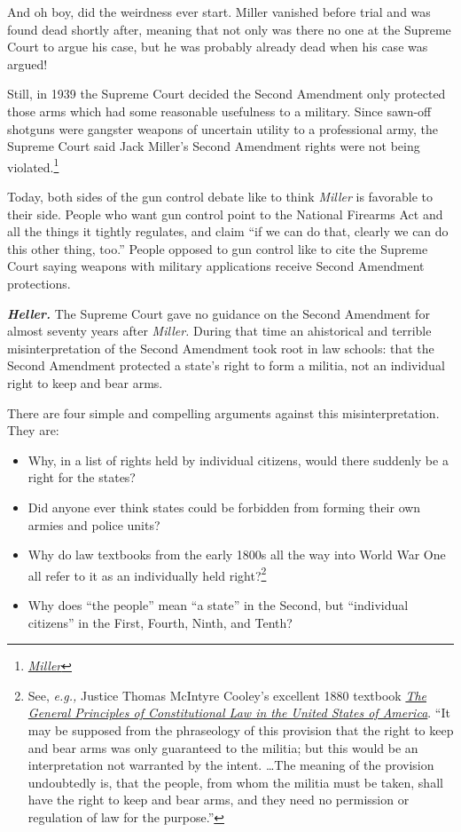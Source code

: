 \documentclass[10pt]{article}
\begin{document}
And oh boy, did the weirdness ever start.  Miller vanished before trial and was found dead shortly after, meaning that not only was there no one at the Supreme Court to argue his case, but he was probably already dead when his case was argued!

Still, in 1939 the Supreme Court decided the Second Amendment only protected those arms which had some reasonable usefulness to a military.  Since sawn-off shotguns were gangster weapons of uncertain utility to a professional army, the Supreme Court said Jack Miller's Second Amendment rights were not being violated.\footnote{\href{https://tile.loc.gov/storage-services/service/ll/usrep/usrep307/usrep307174/usrep307174.pdf}{\it Miller}}

Today, both sides of the gun control debate like to think \textit{Miller} is favorable to their side.  People who want gun control point to the National Firearms Act and all the things it tightly regulates, and claim ``if we can do that, clearly we can do this other thing, too.''  People opposed to gun control like to cite the Supreme Court saying weapons with military applications receive Second Amendment protections.

\vspace{0.5cm}

\textbf{\textit{Heller.}}  The Supreme Court gave no guidance on the Second Amendment for almost seventy years after \textit{Miller.}  During that time an ahistorical and terrible misinterpretation of the Second Amendment took root in law schools: that the Second Amendment protected a state's right to form a militia, not an individual right to keep and bear arms.

There are four simple and compelling arguments against this misinterpretation.  They are:

\begin{itemize}
\item Why, in a list of rights held by individual citizens, would there suddenly be a right for the states?
\item Did anyone ever think states could be forbidden from forming their own armies and police units?
\item Why do law textbooks from the early 1800s all the way into World War One all refer to it as an individually held right?\footnote{See, \textit{e.g.,} Justice Thomas McIntyre Cooley's excellent 1880 textbook \href{https://www.constitution.org/1-Constitution/cmt/tmc/pcl.htm}{\it The General Principles of Constitutional Law in the United States of America}. ``It may be supposed from the phraseology of this provision that the right to keep and bear arms was only guaranteed to the militia; but this would be an interpretation not warranted by the intent. \ldots The meaning of the provision undoubtedly is, that the people, from whom the militia must be taken, shall have the right to keep and bear arms, and they need no permission or regulation of law for the purpose.''}
\item Why does ``the people'' mean ``a state'' in the Second, but ``individual citizens'' in the First, Fourth, Ninth, and Tenth?
\end{itemize}
\end{document}
